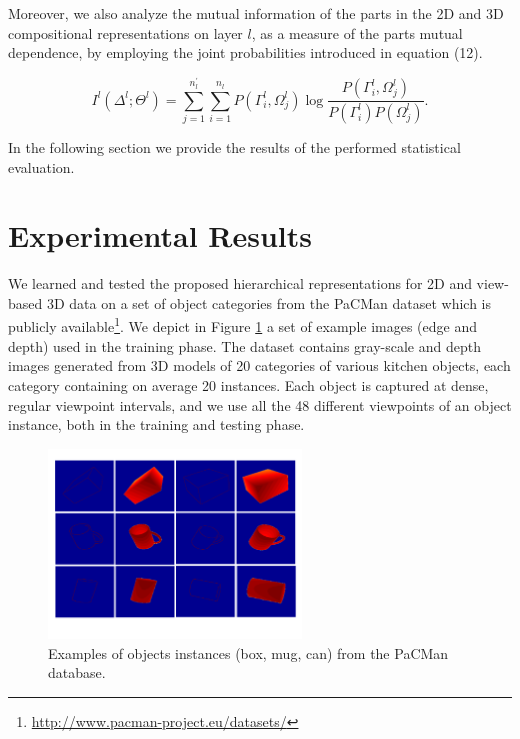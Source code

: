 \documentclass[runningheads]{llncs}
\begin{document}
Moreover, we also analyze the mutual information of the parts in the 2D and 3D compositional representations on layer $l$, as a measure of the parts mutual dependence, by employing the joint probabilities introduced in equation (12).

\begin{equation}
 I^l(\Delta^l;\Theta^l) = \sum\limits_{j=1}^{n_l^{'}}\sum\limits_{i=1}^{n_l}P({\Gamma_i^l},\Omega_j^l)\log \frac{P({\Gamma_i^l},\Omega_j^l)}{P({\Gamma_i^l})P(\Omega_j^l)}.
\end{equation}

In the following section we provide the results of the performed statistical evaluation.

\section{Experimental Results}

We learned and tested the proposed hierarchical representations for 2D and view-based 3D data on a set of object categories from the PaCMan dataset which is publicly available\footnote{\url{http://www.pacman-project.eu/datasets/}}. We depict in Figure \ref{database} a set of example images (edge and depth) used in the training phase. The dataset contains gray-scale and depth images generated from 3D models of 20 categories of various kitchen objects, each category containing on average 20 instances. Each object is captured at dense, regular viewpoint intervals, and we use all the 48 different viewpoints of an object instance, both in the training and testing phase.

\begin{figure}
\begin{center}
\includegraphics[width=0.6\textwidth]{database}
\end{center}
\caption{Examples of objects instances (box, mug, can) from the PaCMan database.}
\label{database}
\end{figure}
\end{document}
